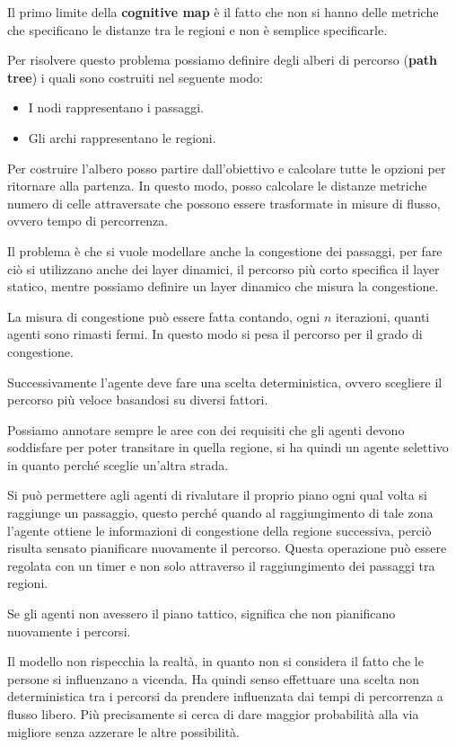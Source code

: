 Il primo limite della \textbf{cognitive map} è il fatto che non si hanno delle 
metriche che specificano le distanze tra le regioni e non è semplice specificarle.

Per risolvere questo problema possiamo definire degli alberi di percorso 
(\textbf{path tree}) i quali sono costruiti nel seguente modo:
\begin{itemize}
    \item I nodi rappresentano i passaggi.
    \item Gli archi rappresentano le regioni.
\end{itemize}

Per costruire l'albero posso partire dall'obiettivo e calcolare tutte le opzioni 
per ritornare alla partenza. In questo modo, posso calcolare le distanze metriche 
numero di celle attraversate che possono essere trasformate in misure di flusso, 
ovvero tempo di percorrenza. 

Il problema è che si vuole modellare anche la congestione dei passaggi, per fare 
ciò si utilizzano anche dei layer dinamici, il percorso più corto specifica
il layer statico, mentre possiamo definire un layer dinamico che misura la congestione.

La misura di congestione può essere fatta contando, ogni $n$ iterazioni, quanti 
agenti sono rimasti fermi. In questo modo si pesa il percorso per il grado di 
congestione. 

Successivamente l'agente deve fare una scelta deterministica, ovvero scegliere 
il percorso più veloce basandosi su diversi fattori.

Possiamo annotare sempre le aree con dei requisiti che gli agenti devono soddisfare
per poter transitare in quella regione, si ha quindi un agente selettivo in 
quanto perché sceglie un'altra strada.

Si può permettere agli agenti di rivalutare il proprio piano ogni qual volta 
si raggiunge un passaggio, questo perché quando al raggiungimento di tale zona 
l'agente ottiene le informazioni di congestione della regione successiva, perciò 
risulta sensato pianificare nuovamente il percorso. Questa operazione può essere 
regolata con un timer e non solo attraverso il raggiungimento dei passaggi tra 
regioni.
\begin{nota}
    Se gli agenti non avessero il piano tattico, significa che non pianificano 
    nuovamente i percorsi.
\end{nota}
Il modello non rispecchia la realtà, in quanto non si considera il fatto che le 
persone si influenzano a vicenda. Ha quindi senso effettuare una scelta non 
deterministica tra i percorsi da prendere influenzata dai tempi di percorrenza a 
flusso libero. Più precisamente si cerca di dare maggior probabilità alla via 
migliore senza azzerare le altre possibilità.

